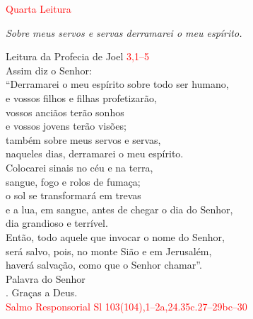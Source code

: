 \documentclass{book}
\begin{document}
\newpage

\begin{center}

    \textcolor{red}{Quarta Leitura}

\end{center}

\begin{flushright}
    \textit{Sobre meus servos e servas derramarei o meu espírito.}
\end{flushright}

\begin{flushleft}

    \vspace{0.2cm}
    Leitura da Profecia de Joel
    \hspace{\fill}
    \textcolor{red}{3,1--5}
    \vspace{0.2cm} \\
    Assim diz o Senhor: \\
    ``Derramarei o meu espírito sobre todo ser humano, \\
    e vossos filhos e filhas profetizarão, \\
    vossos anciãos terão sonhos \\
    e vossos jovens terão visões; \\
    também sobre meus servos e servas, \\
    naqueles dias, derramarei o meu espírito. \\
    Colocarei sinais no céu e na terra, \\
    sangue, fogo e rolos de fumaça; \\
    o sol se transformará em trevas \\
    e a lua, em sangue, antes de chegar o dia do Senhor, \\
    dia grandioso e terrível. \\
    Então, todo aquele que invocar o nome do Senhor, \\
    será salvo, pois, no monte Sião e em Jerusalém, \\
    haverá salvação, como que o Senhor chamar''.
    \vspace{0.1cm} \\
    Palavra do Senhor \\
    {\color{red} \Rbar.} Graças a Deus.
    \vspace{0.2cm} \\
    \textcolor{red}{Salmo Responsorial
        \hspace{\fill} Sl 103(104),1--2a,24.35c.27--29bc--30}
    \vspace{0.1cm} \\

\end{flushleft}
\end{document}

